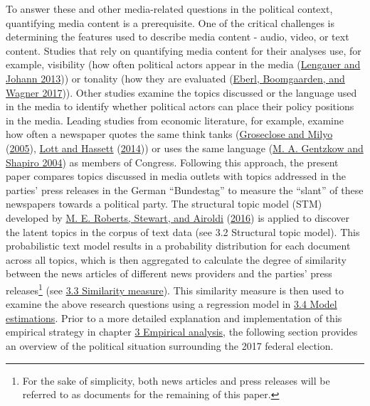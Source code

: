 \documentclass[
  12pt,
]{article}
\begin{document}
To answer these and other media-related questions in the political
context, quantifying media content is a prerequisite. One of the
critical challenges is determining the features used to describe media
content - audio, video, or text content. Studies that rely on
quantifying media content for their analyses use, for example,
visibility (how often political actors appear in the media
(\protect\hyperlink{ref-lengauer_candidate_2013}{Lengauer and Johann
2013})) or tonality (how they are evaluated
(\protect\hyperlink{ref-eberl_one_2017}{Eberl, Boomgaarden, and Wagner
2017})). Other studies examine the topics discussed or the language used
in the media to identify whether political actors can place their policy
positions in the media. Leading studies from economic literature, for
example, examine how often a newspaper quotes the same think tanks
(\protect\hyperlink{ref-groseclose_measure_2005}{Groseclose and Milyo}
(\protect\hyperlink{ref-groseclose_measure_2005}{2005}),
\protect\hyperlink{ref-lott_is_2014}{Lott and Hassett}
(\protect\hyperlink{ref-lott_is_2014}{2014})) or uses the same language
(\protect\hyperlink{ref-gentzkow_media_2004}{M. A. Gentzkow and Shapiro
2004}) as members of Congress. Following this approach, the present
paper compares topics discussed in media outlets with topics addressed
in the parties' press releases in the German ``Bundestag'' to measure
the ``slant'' of these newspapers towards a political party. The
structural topic model (STM) developed by
\protect\hyperlink{ref-roberts_model_2016}{M. E. Roberts, Stewart, and
Airoldi} (\protect\hyperlink{ref-roberts_model_2016}{2016}) is applied
to discover the latent topics in the corpus of text data (see
\protect\hypertarget{structural-topic-model}{}{3.2 Structural topic
model}). This probabilistic text model results in a probability
distribution for each document across all topics, which is then
aggregated to calculate the degree of similarity between the news
articles of different news providers and the parties' press
releases\footnote{For the sake of simplicity, both news articles and
  press releases will be referred to as documents for the remaining of
  this paper.} (see \protect\hyperlink{similarity-measure}{3.3
Similarity measure}). This similarity measure is then used to examine
the above research questions using a regression model in
\protect\hyperlink{model-estimations}{3.4 Model estimations}. Prior to a
more detailed explanation and implementation of this empirical strategy
in chapter \protect\hyperlink{empirical-analysis}{3 Empirical analysis},
the following section provides an overview of the political situation
surrounding the 2017 federal election.
\end{document}

